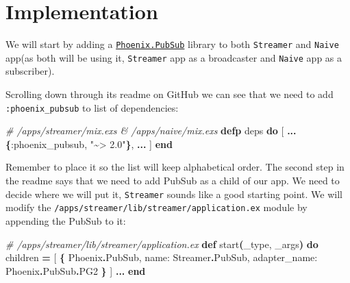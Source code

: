 \documentclass[
  oneside]{book}
\newenvironment{Shaded}{\begin{snugshade}}{\end{snugshade}}
\newcommand{\CommentTok}[1]{\textcolor[rgb]{0.56,0.35,0.01}{\textit{#1}}}
\newcommand{\ConstantTok}[1]{\textcolor[rgb]{0.56,0.35,0.01}{#1}}
\newcommand{\FunctionTok}[1]{\textcolor[rgb]{0.13,0.29,0.53}{\textbf{#1}}}
\newcommand{\KeywordTok}[1]{\textcolor[rgb]{0.13,0.29,0.53}{\textbf{#1}}}
\newcommand{\NormalTok}[1]{#1}
\newcommand{\OperatorTok}[1]{\textcolor[rgb]{0.81,0.36,0.00}{\textbf{#1}}}
\newcommand{\OtherTok}[1]{\textcolor[rgb]{0.56,0.35,0.01}{#1}}
\newcommand{\StringTok}[1]{\textcolor[rgb]{0.31,0.60,0.02}{#1}}
\newcommand{\VariableTok}[1]{\textcolor[rgb]{0.00,0.00,0.00}{#1}}
\begin{document}
\newpage

\section{Implementation}\label{implementation}

We will start by adding a \href{https://github.com/phoenixframework/phoenix_pubsub}{\texttt{Phoenix.PubSub}} library to both \texttt{Streamer} and \texttt{Naive} app(as both will be using it, \texttt{Streamer} app as a broadcaster and \texttt{Naive} app as a subscriber).

Scrolling down through its readme on GitHub we can see that we need to add \texttt{:phoenix\_pubsub} to list of dependencies:

\begin{Shaded}
\begin{Highlighting}[]
\CommentTok{\# /apps/streamer/mix.exs \& /apps/naive/mix.exs}
  \KeywordTok{defp}\NormalTok{ deps }\KeywordTok{do}
    \OtherTok{[}
      \OperatorTok{...}
      \FunctionTok{\{}\VariableTok{:phoenix\_pubsub}\NormalTok{, }\StringTok{"\textasciitilde{}\textgreater{} 2.0"}\FunctionTok{\}}\NormalTok{,}
      \OperatorTok{...}
    \OtherTok{]}
  \KeywordTok{end}
\end{Highlighting}
\end{Shaded}

Remember to place it so the list will keep alphabetical order. The second step in the readme says that we need to add PubSub as a child of our app. We need to decide where we will put it, \texttt{Streamer} sounds like a good starting point. We will modify the \texttt{/apps/streamer/lib/streamer/application.ex} module by appending the PubSub to it:

\begin{Shaded}
\begin{Highlighting}[]
\CommentTok{\# /apps/streamer/lib/streamer/application.ex}
  \KeywordTok{def}\NormalTok{ start}\FunctionTok{(}\NormalTok{\_type, \_args}\FunctionTok{)} \KeywordTok{do}
\NormalTok{    children }\OperatorTok{=} \OtherTok{[}
      \FunctionTok{\{}
        \ConstantTok{Phoenix}\OperatorTok{.}\ConstantTok{PubSub}\NormalTok{,}
        \VariableTok{name:} \ConstantTok{Streamer}\OperatorTok{.}\ConstantTok{PubSub}\NormalTok{, }\VariableTok{adapter\_name:} \ConstantTok{Phoenix}\OperatorTok{.}\ConstantTok{PubSub}\OperatorTok{.}\ConstantTok{PG2}
      \FunctionTok{\}}
    \OtherTok{]}
    \OperatorTok{...}
  \KeywordTok{end}
\end{Highlighting}
\end{Shaded}
\end{document}
